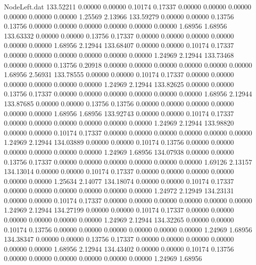\begin{filecontents}{NodeLeft.dat}
 133.52211    0.00000    0.00000     0.10174    0.17337    0.00000    0.00000    0.00000    0.00000    0.00000    0.00000    1.25569    2.13966
 133.59279    0.00000    0.00000     0.13756    0.13756    0.00000    0.00000    0.00000    0.00000    0.00000    0.00000    1.68956    1.68956
 133.63332    0.00000    0.00000     0.13756    0.17337    0.00000    0.00000    0.00000    0.00000    0.00000    0.00000    1.68956    2.12944
 133.68407    0.00000    0.00000     0.10174    0.17337    0.00000    0.00000    0.00000    0.00000    0.00000    0.00000    1.24969    2.12944
 133.73468    0.00000    0.00000     0.13756    0.20918    0.00000    0.00000    0.00000    0.00000    0.00000    0.00000    1.68956    2.56931
 133.78555    0.00000    0.00000     0.10174    0.17337    0.00000    0.00000    0.00000    0.00000    0.00000    0.00000    1.24969    2.12944
 133.82625    0.00000    0.00000     0.13756    0.17337    0.00000    0.00000    0.00000    0.00000    0.00000    0.00000    1.68956    2.12944
 133.87685    0.00000    0.00000     0.13756    0.13756    0.00000    0.00000    0.00000    0.00000    0.00000    0.00000    1.68956    1.68956
 133.92743    0.00000    0.00000     0.10174    0.17337    0.00000    0.00000    0.00000    0.00000    0.00000    0.00000    1.24969    2.12944
 133.98820    0.00000    0.00000     0.10174    0.17337    0.00000    0.00000    0.00000    0.00000    0.00000    0.00000    1.24969    2.12944
 134.03889    0.00000    0.00000     0.10174    0.13756    0.00000    0.00000    0.00000    0.00000    0.00000    0.00000    1.24969    1.68956
 134.07938    0.00000    0.00000     0.13756    0.17337    0.00000    0.00000    0.00000    0.00000    0.00000    0.00000    1.69126    2.13157
 134.13014    0.00000    0.00000     0.10174    0.17337    0.00000    0.00000    0.00000    0.00000    0.00000    0.00000    1.25634    2.14077
 134.18074    0.00000    0.00000     0.10174    0.17337    0.00000    0.00000    0.00000    0.00000    0.00000    0.00000    1.24972    2.12949
 134.23131    0.00000    0.00000     0.10174    0.17337    0.00000    0.00000    0.00000    0.00000    0.00000    0.00000    1.24969    2.12944
 134.27199    0.00000    0.00000     0.10174    0.17337    0.00000    0.00000    0.00000    0.00000    0.00000    0.00000    1.24969    2.12944
 134.32265    0.00000    0.00000     0.10174    0.13756    0.00000    0.00000    0.00000    0.00000    0.00000    0.00000    1.24969    1.68956
 134.38347    0.00000    0.00000     0.13756    0.17337    0.00000    0.00000    0.00000    0.00000    0.00000    0.00000    1.68956    2.12944
 134.43402    0.00000    0.00000     0.10174    0.13756    0.00000    0.00000    0.00000    0.00000    0.00000    0.00000    1.24969    1.68956

\end{filecontents}
